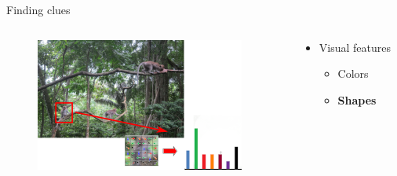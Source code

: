 \documentclass{beamer}[10pt, usepdftitle=false, handout]
\begin{document}
    \begin{frame}

	Finding clues
	\vspace*{1.0em}	
	
\begin{columns}
\begin{column}{0.5\textwidth}
	\begin{figure}
		\includegraphics[scale=0.6]{monkey-6.png} 
	\end{figure}	 
\end{column}
\begin{column}{0.5\textwidth}  %
    \begin{center}
	\begin{itemize}
	\item{Visual features
		\begin{itemize}
		\item{Colors}
		\item{\textbf{Shapes}}
		\end{itemize}			
	}
	\end{itemize}	     
     
     \end{center}
	\end{column}
	\end{columns}	
				
    \end{frame}	
	
\end{document}
